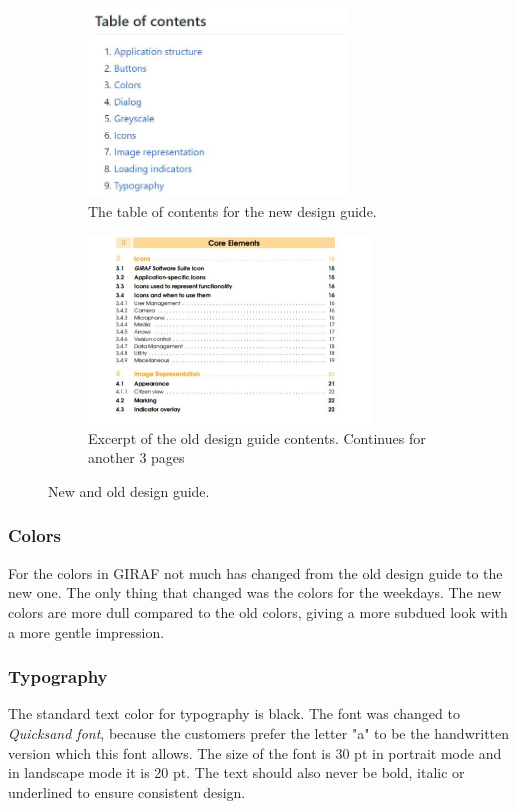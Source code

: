 \begin{figure}[H]
    \begin{subfigure}{0.5\textwidth}
    \includegraphics[width=1\linewidth, height=5cm]{figures/table-of-content-designguide.JPG}
    \caption{The table of contents for the new design guide.}
    \label{fig:new-designguide}
    \end{subfigure}
    \begin{subfigure}{0.6\textwidth}
        \includegraphics[width=1\linewidth, height=5cm]{figures/old-design-guide}
    \caption{Excerpt of the old design guide contents. Continues for another 3 pages}
    \label{fig:old-designguide}
    \end{subfigure} 
    \caption{New and old design guide.}
    \label{fig:designguides}
\end{figure} 

\subsubsection{Colors}
For the colors in GIRAF not much has changed from the old design guide to the new one. 
The only thing that changed was the colors for the weekdays.
The new colors are more dull compared to the old colors, giving a more subdued look with a more gentle impression.

\subsubsection{Typography}
The standard text color for typography is black.
The font was changed to \textit{Quicksand font}, because the customers prefer the letter "a" to be the handwritten version which this font allows.
The size of the font is 30 pt in portrait mode and in landscape mode it is 20 pt.
The text should also never be bold, italic or underlined to ensure consistent design.

